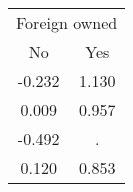 \begin{tabular}{cc}
\toprule
\multicolumn{2}{c}{Foreign owned} \\
\cmidrule(lr){1-2}
No & Yes \\
\midrule
-0.232 & 1.130 \\
0.009 & 0.957 \\
-0.492 & . \\
0.120 & 0.853 \\
\bottomrule
\end{tabular}
